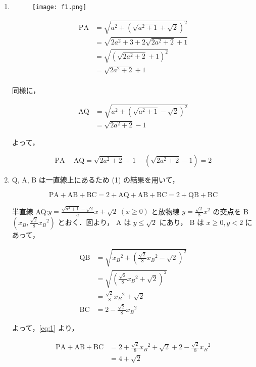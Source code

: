 \documentclass[a4paper]{ltjsarticle}
\begin{document}
\begin{enumerate}[label=(\arabic*)]
    \item

          \begin{figure}[!ht]
              \centering
              \texttt{[image: f1.png]}
          \end{figure}

          \begin{align*}
              \mathrm{PA} & =\sqrt{a^2+(\sqrt{a^2+1}+\sqrt{2})^2} \\
                          & =\sqrt{2a^2+3+2\sqrt{2a^2+2}+1}       \\
                          & =\sqrt{(\sqrt{2a^2+2}+1)^2}           \\
                          & =\sqrt{2a^2+2}+1                      \\
          \end{align*}

          同様に，

          \begin{align*}
              \mathrm{AQ} & =\sqrt{a^2+(\sqrt{a^2+1}-\sqrt{2})^2} \\
                          & =\sqrt{2a^2+2}-1
          \end{align*}

          よって，

          \begin{equation*}
              \mathrm{PA}-\mathrm{AQ}=\sqrt{2a^2+2}+1-(\sqrt{2a^2+2}-1)=2
          \end{equation*}

    \item Q, A, B は一直線上にあるため (1) の結果を用いて，

          \begin{equation}
              \mathrm{PA}+\mathrm{AB}+\mathrm{BC}=2+\mathrm{AQ}+\mathrm{AB}+\mathrm{BC}=2+\mathrm{QB}+\mathrm{BC}\label{eq:1}
          \end{equation}

          半直線 AQ:$y=\frac{\sqrt{a^2+1}-\sqrt{2}}{a}x+\sqrt{2}\ (x\geq 0)$ と放物線 $y=\frac{\sqrt{2}}{8}x^2$ の交点を B$(x_B,\frac{\sqrt{2}}{8}{x_B}^2)$ とおく．図より， A は $y\leq \sqrt{2}$ にあり， B は $x\geq 0, y<2$ にあって，

          \begin{align*}
              \mathrm{QB} & =\sqrt{{x_B}^2+\left(\frac{\sqrt{2}}{8}{x_B}^2-\sqrt{2}\right)^2} \\
                          & =\sqrt{\left(\frac{\sqrt{2}}{8}{x_B}^2+\sqrt{2}\right)^2}         \\
                          & =\frac{\sqrt{2}}{8}{x_B}^2+\sqrt{2}                               \\
              \mathrm{BC} & =2-\frac{\sqrt{2}}{8}{x_B}^2
          \end{align*}

          よって，\eqref{eq:1} より，

          \begin{align*}
              \mathrm{PA}+\mathrm{AB}+\mathrm{BC} & =2+\frac{\sqrt{2}}{8}{x_B}^2+\sqrt{2}+2-\frac{\sqrt{2}}{8}{x_B}^2 \\
                                                  & =4+\sqrt{2}
          \end{align*}
\end{enumerate}
\end{document}
